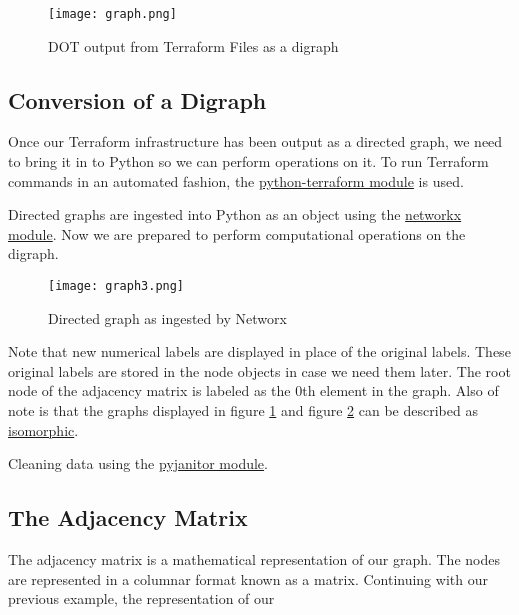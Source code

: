 \justifying
\begin{figure}[H]
	\texttt{[image: graph.png]}
	\caption{DOT output from Terraform Files as a digraph}
	\label{pygraph}
\end{figure}

\subsection{\label{sec:conversion}Conversion of a Digraph}

\justifying
Once our Terraform infrastructure has been output as a directed graph, we need to bring it in to Python so we can
perform operations on it. To run Terraform commands in an automated fashion, 
the \href{https://pypi.org/project/python-terraform/}{python-terraform module} is used.
\vspace{2mm}

\justifying
Directed graphs are ingested into Python as an object using the \href{https://pypi.org/project/networkx/}{networkx module}. Now we are prepared
to perform computational operations on the digraph.
\vspace{2mm}

\justifying
\begin{figure}[H]
    \texttt{[image: graph3.png]}
    \caption{Directed graph as ingested by Networx}
    \label{digraph}
\end{figure}

\justifying
Note that new numerical labels are displayed in place of the original labels. These original labels are
stored in the node objects in case we need them later. The root node of the adjacency matrix is labeled
as the 0th element in the graph. Also of note is that the graphs displayed in figure \ref{pygraph} and figure \ref{digraph} can be described as \href{https://en.wikipedia.org/wiki/Graph\_isomorphism}{isomorphic}.
\vspace{2mm}

\justifying
Cleaning data using the \href{}{pyjanitor module}.
\vspace{2mm}

\subsection{\label{sec:adjacency}The Adjacency Matrix}

\justifying
The adjacency matrix is a mathematical representation of our graph. The nodes are represented in a
columnar format known as a matrix. Continuing with our previous example, the representation of our

